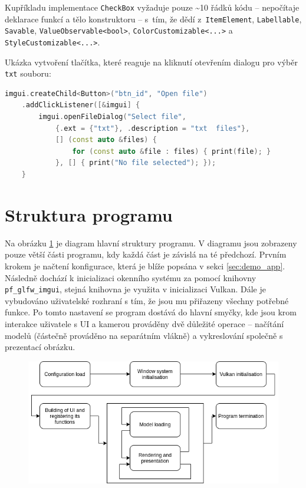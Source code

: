 Kupříkladu implementace \texttt{CheckBox} vyžaduje pouze \textasciitilde10 řádků kódu -- nepočítaje deklarace funkcí a tělo konstruktoru -- s~tím, že dědí z~\texttt{ItemElement}, \texttt{Labellable}, \texttt{Savable}, \texttt{ValueObservable<bool>}, \texttt{ColorCustomizable<...>} a \texttt{StyleCustomizable<...>}.

Ukázka vytvoření tlačítka, které reaguje na kliknutí otevřením dialogu pro výběr \texttt{txt} souboru:

\begin{lstlisting}[language=C++, caption={Vytvoření tlačítka pro výběr souboru}]
imgui.createChild<Button>("btn_id", "Open file")
    .addClickListener([&imgui] {
        imgui.openFileDialog("Select file", 
            {.ext = {"txt"}, .description = "txt  files"}, 
            [] (const auto &files) {
                for (const auto &file : files) { print(file); }
            }, [] { print("No file selected"); });
    }
\end{lstlisting}

\section{Struktura programu}
Na obrázku \ref{fig:program_flow} je diagram hlavní struktury programu. V diagramu jsou zobrazeny pouze větší části programu, kdy každá část je závislá na té předchozí. Prvním krokem je načtení konfigurace, která je blíže popsána v sekci \ref{sec:demo_app}. Následně dochází k inicializaci okenního systému za pomocí knihovny \texttt{pf\_glfw\_imgui}, stejná knihovna je využita v inicializaci Vulkan. Dále je vybudováno uživatelské rozhraní s tím, že jsou mu přiřazeny všechny potřebné funkce. Po tomto nastavení se program dostává do hlavní smyčky, kde jsou krom interakce uživatele s UI a kamerou prováděny dvě důležité operace -- načítání modelů (částečně prováděno na separátním vlákně) a vykreslování společně s prezentací obrázku.

\begin{figure}[H]
	\centering
	\includegraphics[scale=0.7]{images/program_flow.png}
	\captionsetup{justification=centering}
	\label{fig:program_flow}
\end{figure}

